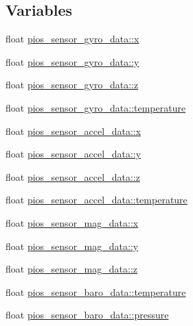 \subsection*{Variables}
\begin{DoxyCompactItemize}
\item 
float \hyperlink{group___p_i_o_s___s_e_n_s_o_r_s_gaa3675ec6a2d0ed4f805311fef19c0c8b}{pios\-\_\-sensor\-\_\-gyro\-\_\-data\-::x}
\item 
float \hyperlink{group___p_i_o_s___s_e_n_s_o_r_s_gaad82a3c1fcca51db61c84eb792d19842}{pios\-\_\-sensor\-\_\-gyro\-\_\-data\-::y}
\item 
float \hyperlink{group___p_i_o_s___s_e_n_s_o_r_s_ga54e998de17a4da6aa1f8504cce31a31c}{pios\-\_\-sensor\-\_\-gyro\-\_\-data\-::z}
\item 
float \hyperlink{group___p_i_o_s___s_e_n_s_o_r_s_ga9f44abb5eea58728c07c17a58155f6e8}{pios\-\_\-sensor\-\_\-gyro\-\_\-data\-::temperature}
\item 
float \hyperlink{group___p_i_o_s___s_e_n_s_o_r_s_gae32485cbb3023e21caf5ac1fd8378fb3}{pios\-\_\-sensor\-\_\-accel\-\_\-data\-::x}
\item 
float \hyperlink{group___p_i_o_s___s_e_n_s_o_r_s_ga9f94596a8b62bafbbbd58e9196347e82}{pios\-\_\-sensor\-\_\-accel\-\_\-data\-::y}
\item 
float \hyperlink{group___p_i_o_s___s_e_n_s_o_r_s_ga8d801598e8a0f5aade459361b3ec9b7a}{pios\-\_\-sensor\-\_\-accel\-\_\-data\-::z}
\item 
float \hyperlink{group___p_i_o_s___s_e_n_s_o_r_s_gadb57b0d1050bd04870c0ad76832f4287}{pios\-\_\-sensor\-\_\-accel\-\_\-data\-::temperature}
\item 
float \hyperlink{group___p_i_o_s___s_e_n_s_o_r_s_ga3ec7375b9b8c7ab5ddd50349c76ac818}{pios\-\_\-sensor\-\_\-mag\-\_\-data\-::x}
\item 
float \hyperlink{group___p_i_o_s___s_e_n_s_o_r_s_ga04a14fcd48fda39a469229e1b01c0b2d}{pios\-\_\-sensor\-\_\-mag\-\_\-data\-::y}
\item 
float \hyperlink{group___p_i_o_s___s_e_n_s_o_r_s_ga77b8adea9b5e8b43c3ce7d4c60784862}{pios\-\_\-sensor\-\_\-mag\-\_\-data\-::z}
\item 
float \hyperlink{group___p_i_o_s___s_e_n_s_o_r_s_ga9cb0c320301d3a8028859d3bf920669f}{pios\-\_\-sensor\-\_\-baro\-\_\-data\-::temperature}
\item 
float \hyperlink{group___p_i_o_s___s_e_n_s_o_r_s_ga43ba219138a0c31669a1af1b45f7a7f6}{pios\-\_\-sensor\-\_\-baro\-\_\-data\-::pressure}
\item 

\end{DoxyCompactItemize}
